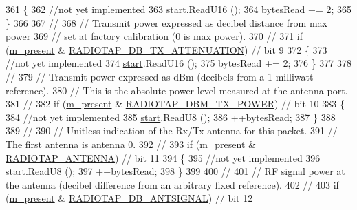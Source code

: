 \begin{DoxyCode}
361     \{
362       \textcolor{comment}{//not yet implemented}
363       \hyperlink{namespacevisualizer_1_1core_a2a35e5d8a34af358b508dac8635754e0}{start}.ReadU16 ();
364       bytesRead += 2;
365     \}
366 
367   \textcolor{comment}{//}
368   \textcolor{comment}{// Transmit power expressed as decibel distance from max power}
369   \textcolor{comment}{// set at factory calibration (0 is max power).}
370   \textcolor{comment}{//}
371   \textcolor{keywordflow}{if} (\hyperlink{classns3_1_1RadiotapHeader_a8b8aca212245ad4ad1aa796d4cc802bb}{m\_present} & \hyperlink{classns3_1_1RadiotapHeader_afd15dfe66387dfbcbf62865d024f58ffa9711d2d12b4ba6ff71a85711e2c8b5da}{RADIOTAP\_DB\_TX\_ATTENUATION}) \textcolor{comment}{// bit 9}
372     \{
373       \textcolor{comment}{//not yet implemented}
374       \hyperlink{namespacevisualizer_1_1core_a2a35e5d8a34af358b508dac8635754e0}{start}.ReadU16 ();
375       bytesRead += 2;
376     \}
377 
378   \textcolor{comment}{//}
379   \textcolor{comment}{// Transmit power expressed as dBm (decibels from a 1 milliwatt reference).}
380   \textcolor{comment}{// This is the absolute power level measured at the antenna port.}
381   \textcolor{comment}{//}
382   \textcolor{keywordflow}{if} (\hyperlink{classns3_1_1RadiotapHeader_a8b8aca212245ad4ad1aa796d4cc802bb}{m\_present} & \hyperlink{classns3_1_1RadiotapHeader_afd15dfe66387dfbcbf62865d024f58ffa5f2ae8d187d9e12a5f253dddd4426c38}{RADIOTAP\_DBM\_TX\_POWER}) \textcolor{comment}{// bit 10}
383     \{
384       \textcolor{comment}{//not yet implemented}
385       \hyperlink{namespacevisualizer_1_1core_a2a35e5d8a34af358b508dac8635754e0}{start}.ReadU8 ();
386       ++bytesRead;
387     \}
388 
389   \textcolor{comment}{//}
390   \textcolor{comment}{// Unitless indication of the Rx/Tx antenna for this packet.}
391   \textcolor{comment}{// The first antenna is antenna 0.}
392   \textcolor{comment}{//}
393   \textcolor{keywordflow}{if} (\hyperlink{classns3_1_1RadiotapHeader_a8b8aca212245ad4ad1aa796d4cc802bb}{m\_present} & \hyperlink{classns3_1_1RadiotapHeader_afd15dfe66387dfbcbf62865d024f58ffaa440618ab1f857767691342a07af46f9}{RADIOTAP\_ANTENNA}) \textcolor{comment}{// bit 11}
394     \{
395       \textcolor{comment}{//not yet implemented}
396       \hyperlink{namespacevisualizer_1_1core_a2a35e5d8a34af358b508dac8635754e0}{start}.ReadU8 ();
397       ++bytesRead;
398     \}
399 
400   \textcolor{comment}{//}
401   \textcolor{comment}{// RF signal power at the antenna (decibel difference from an arbitrary fixed reference).}
402   \textcolor{comment}{//}
403   \textcolor{keywordflow}{if} (\hyperlink{classns3_1_1RadiotapHeader_a8b8aca212245ad4ad1aa796d4cc802bb}{m\_present} & \hyperlink{classns3_1_1RadiotapHeader_afd15dfe66387dfbcbf62865d024f58ffa90aae5cb5f719c05f34dfbedaf390828}{RADIOTAP\_DB\_ANTSIGNAL}) \textcolor{comment}{// bit 12}

\end{DoxyCode}
